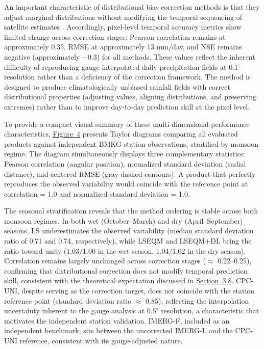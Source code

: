 \documentclass[11pt,a4paper]{article}
\begin{document}
An important characteristic of distributional bias correction methods is
that they adjust marginal distributions without modifying the temporal
sequencing of satellite estimates \cite{ref34,ref11}. Accordingly, pixel-level
temporal accuracy metrics show limited change across correction stages:
Pearson correlation remains at approximately 0.35, RMSE at approximately
13 mm/day, and NSE remains negative (approximately \(-0.3\)) for all
methods. These values reflect the inherent difficulty of reproducing
gauge-interpolated daily precipitation fields at 0.1\(^{\circ}\)
resolution rather than a deficiency of the correction framework. The
method is designed to produce climatologically unbiased rainfall fields
with correct distributional properties (adjusting values, aligning
distributions, and preserving extremes) rather than to improve
day-to-day prediction skill at the pixel level.

To provide a compact visual summary of these multi-dimensional
performance characteristics, \hyperref[fig4]{Figure~4} presents Taylor diagrams \cite{ref35}
comparing all evaluated products against independent BMKG station
observations, stratified by monsoon regime. The diagram simultaneously
displays three complementary statistics: Pearson correlation (angular
position), normalized standard deviation (radial distance), and centered
RMSE (gray dashed contours). A product that perfectly reproduces the
observed variability would coincide with the reference point at
correlation = 1.0 and normalized standard deviation = 1.0.

The seasonal stratification reveals that the method ordering is stable
across both monsoon regimes. In both wet (October--March) and dry
(April--September) seasons, LS underestimates the observed variability
(median standard deviation ratio of 0.71 and 0.74, respectively), while
LSEQM and LSEQM+DL bring the ratio toward unity (1.03/1.00 in the wet
season, 1.04/1.02 in the dry season). Correlation remains largely
unchanged across correction stages (\(\approx\) 0.22--0.25), confirming
that distributional correction does not modify temporal prediction skill,
consistent with the theoretical expectation discussed in \hyperref[discussion]{Section~3.8}. CPC-UNI, despite serving as the correction target, does not
coincide with the station reference point (standard deviation ratio
\(\approx\) 0.85), reflecting the interpolation uncertainty inherent to
the gauge analysis at \(0.5^{\circ}\) resolution, a characteristic
that motivates the independent station validation. IMERG-F, included as
an independent benchmark, sits between the uncorrected IMERG-L and the
CPC-UNI reference, consistent with its gauge-adjusted nature.
\end{document}

